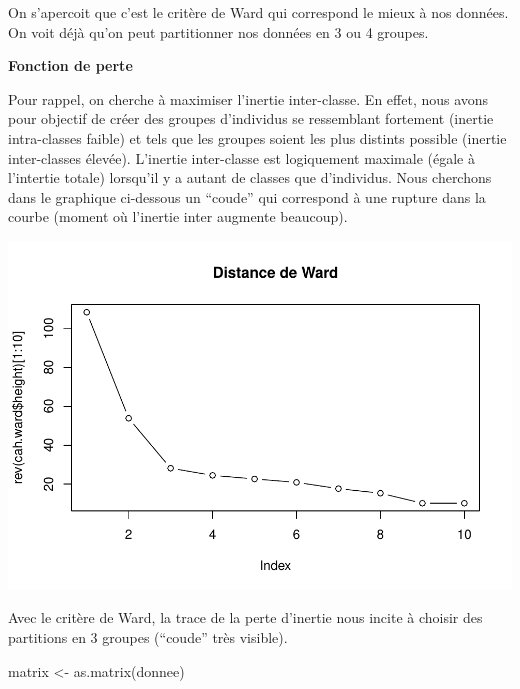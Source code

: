 \documentclass[
]{article}
\newenvironment{Shaded}{}{}
\newcommand{\AttributeTok}[1]{#1}
\newcommand{\DecValTok}[1]{#1}
\newcommand{\FunctionTok}[1]{#1}
\newcommand{\NormalTok}[1]{#1}
\newcommand{\OtherTok}[1]{\textcolor[rgb]{1.00,0.25,0.00}{#1}}
\newcommand{\SpecialCharTok}[1]{\textcolor[rgb]{0.00,0.50,0.50}{#1}}
\newcommand{\StringTok}[1]{\textcolor[rgb]{0.00,0.50,0.50}{#1}}
\begin{document}
On s'apercoit que c'est le critère de Ward qui correspond le mieux à nos
données. On voit déjà qu'on peut partitionner nos données en 3 ou 4
groupes.

\textbf{Fonction de perte}

Pour rappel, on cherche à maximiser l'inertie inter-classe. En effet,
nous avons pour objectif de créer des groupes d'individus se ressemblant
fortement (inertie intra-classes faible) et tels que les groupes soient
les plus distints possible (inertie inter-classes élevée). L'inertie
inter-classe est logiquement maximale (égale à l'intertie totale)
lorsqu'il y a autant de classes que d'individus. Nous cherchons dans le
graphique ci-dessous un ``coude'' qui correspond à une rupture dans la
courbe (moment où l'inertie inter augmente beaucoup).

\begin{Shaded}
\end{Shaded}

\includegraphics{Projet_files/figure-latex/unnamed-chunk-15-1.pdf}

Avec le critère de Ward, la trace de la perte d'inertie nous incite à
choisir des partitions en 3 groupes (``coude'' très visible).

\begin{Shaded}
\begin{Highlighting}[]
\NormalTok{matrix }\OtherTok{\textless{}{-}} \FunctionTok{as.matrix}\NormalTok{(donnee)}
\end{Highlighting}
\end{Shaded}
\end{document}
